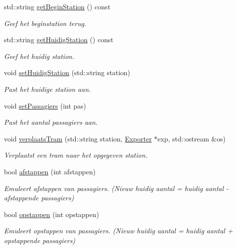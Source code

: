 \begin{DoxyCompactItemize}
std\+::string \hyperlink{class_tram_aba7b84414cd60d013ac1db3f3403497d}{get\+Begin\+Station} () const 
\begin{DoxyCompactList}\small\item\em Geef het beginstation terug. \end{DoxyCompactList}\item 
std\+::string \hyperlink{class_tram_ae7bc337a42b2d839b4da5f648b781e79}{get\+Huidig\+Station} () const 
\begin{DoxyCompactList}\small\item\em Geef het huidig station. \end{DoxyCompactList}\item 
void \hyperlink{class_tram_ad8627700455e2d24563e08a72d887197}{set\+Huidig\+Station} (std\+::string station)
\begin{DoxyCompactList}\small\item\em Past het huidige station aan. \end{DoxyCompactList}\item 
void \hyperlink{class_tram_a3454b4b012930b02eff8fd22b7d9428a}{set\+Passagiers} (int pas)
\begin{DoxyCompactList}\small\item\em Past het aantal passagiers aan. \end{DoxyCompactList}\item 
void \hyperlink{class_tram_a8d55296c7ede4aa92c9b3a4b2a9495a8}{verplaats\+Tram} (std\+::string station, \hyperlink{class_exporter}{Exporter} $\ast$exp, std\+::ostream \&os)
\begin{DoxyCompactList}\small\item\em Verplaatst een tram naar het opgegeven station. \end{DoxyCompactList}\item 
bool \hyperlink{class_tram_a81186910caa5212b4a87eec84cd10a46}{afstappen} (int afstappen)
\begin{DoxyCompactList}\small\item\em Emuleert afstappen van passagiers. (Nieuw huidig aantal = huidig aantal -\/ afstappende passagiers) \end{DoxyCompactList}\item 
bool \hyperlink{class_tram_aaeb00c535a6854f85dcc42cdff97ad0c}{opstappen} (int opstappen)
\begin{DoxyCompactList}\small\item\em Emuleert opstappen van passagiers. (Nieuw huidig aantal = huidig aantal + opstappende passagiers) \end{DoxyCompactList}\end{DoxyCompactItemize}


